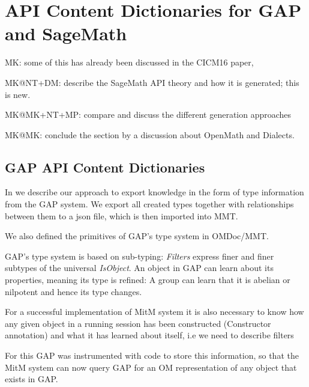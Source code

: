 \section{API Content Dictionaries for GAP and SageMath}\label{sec:apit}
\begin{todolist}{MK: some of this has already been discussed in the CICM16 paper, }
\item MK@NT+DM: describe the SageMath API theory and how it is generated; this is
  new. 
\item MK@MK+NT+MP: compare and discuss the different generation approaches
\item MK@MK: conclude the section by a discussion about OpenMath and Dialects.
\end{todolist}


\subsection{GAP API Content Dictionaries}

In \cite{DehKohKon:iop16} we describe our approach to export knowledge in the form of type information from the GAP system. 
We export all created types together with relationships between them to a json file, which is then imported into MMT.

We also defined the primitives of GAP's type system in OMDoc/MMT.

GAP's type system is based on sub-typing: \emph{Filters} express finer and finer subtypes of the universal \emph{IsObject}.
An object in GAP can learn about its properties, meaning its type is refined: A group can learn that it is abelian or nilpotent and hence its type changes.

For a successful implementation of MitM system it is also necessary to know how any given object in a running session has been constructed (Constructor annotation) and what it has learned about itself, i.e we need to describe filters

For this GAP was instrumented with code to store this information, so that the MitM system can now query GAP for an OM representation of any object that exists in GAP.  

